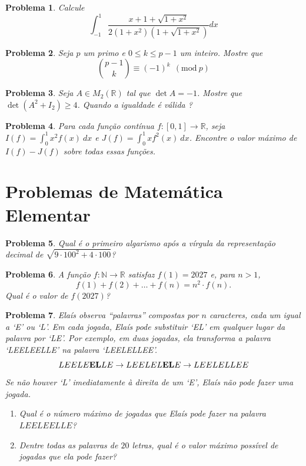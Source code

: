 \documentclass{hipatia}
\newtheorem{problem*}{Problema}
\begin{document}
\begin{problem*}
Calcule 
$$\displaystyle \int_{-1}^{1} \frac{x + 1 + \sqrt{1 + x^2}}{2(1 + x^2)\left(1 + \sqrt{1 + x^2}\right)} dx$$
\end{problem*}


\begin{problem*} Seja $p$ um primo e $0 \leq k \leq p-1$ um inteiro. Mostre que $$\binom{p-1}{k} \equiv (-1)^k \ \ (\text{mod} \ p)$$
\end{problem*}



\begin{problem*} Seja $A \in M_2(\mathbb{R})$ tal que $\det A = -1$. Mostre que $\det(A^2 + I_2) \geq 4$. Quando a igualdade é válida ?
\end{problem*}



\begin{problem*} 
Para cada função contínua $f: [0,1] \rightarrow \mathbb{R}$, seja $I(f) = \int_0^1 x^2f(x) \ dx$ e $J(f) = \int_0^1 xf^2(x) \ dx$. Encontre o valor máximo de $I(f) - J(f)$ sobre todas essas funções. 
\end{problem*}




\section*{Problemas de Matemática Elementar}

\begin{problem*}
Qual é o primeiro algarismo após a vírgula da representação decimal de $\sqrt{9 \cdot 100^2 + 4 \cdot 100}$?
\end{problem*}


\begin{problem*}
A função $f: \mathbb{N} \rightarrow \mathbb{R}$ satisfaz $f(1) = 2027$ e, para $n > 1$, $$f(1) + f(2) + \ldots + f(n) = n^2 \cdot f(n).$$ Qual é o valor de $f(2027)$?

\end{problem*}



\begin{problem*}
Elaís observa ``palavras'' compostas por \( n \) caracteres, cada um igual a `E' ou `L'.  
Em cada jogada, Elaís pode substituir `EL' em qualquer lugar da palavra por `LE'. Por exemplo, em duas jogadas, ela transforma a palavra `LEELEELLE' na palavra `LEELELLEE'. 
$$LEELE{\bf EL}LE \rightarrow LEELEL{\bf EL}E \rightarrow LEELELLEE$$
\noindent Se não houver `L' imediatamente à direita de um `E', Elaís não pode fazer uma jogada.
\begin{enumerate}
\item[a)] Qual é o número máximo de jogadas que Elaís pode fazer na palavra $LEELEELLE$?

\item[b)] Dentre todas as palavras de $20$ letras, qual é o valor máximo possível de jogadas que ela pode fazer?
\end{enumerate}
\end{problem*}
\end{document}
